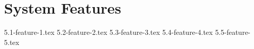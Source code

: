\section{System Features}

{5.1-feature-1.tex} \clearpage
{5.2-feature-2.tex} \clearpage
{5.3-feature-3.tex} \clearpage
{5.4-feature-4.tex} \clearpage
{5.5-feature-5.tex} 
